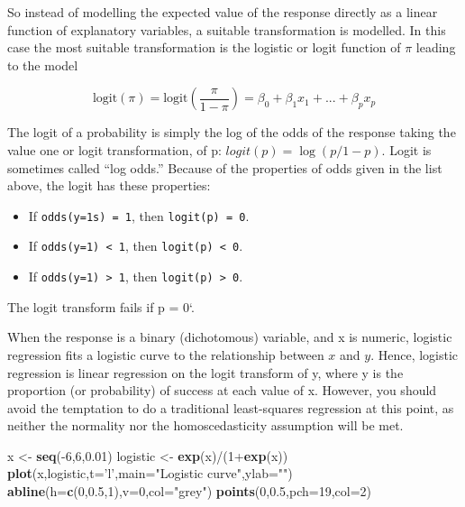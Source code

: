\documentclass[]{article}
\def\tightlist{}
\newenvironment{Shaded}{\begin{snugshade}}{\end{snugshade}}
\newcommand{\KeywordTok}[1]{\textcolor[rgb]{0.13,0.29,0.53}{\textbf{{#1}}}}
\newcommand{\DataTypeTok}[1]{\textcolor[rgb]{0.13,0.29,0.53}{{#1}}}
\newcommand{\DecValTok}[1]{\textcolor[rgb]{0.00,0.00,0.81}{{#1}}}
\newcommand{\FloatTok}[1]{\textcolor[rgb]{0.00,0.00,0.81}{{#1}}}
\newcommand{\StringTok}[1]{\textcolor[rgb]{0.31,0.60,0.02}{{#1}}}
\newcommand{\NormalTok}[1]{{#1}}
\numberwithin{equation}{section}
\begin{document}
So instead of modelling the expected value of the response directly as a
linear function of explanatory variables, a suitable transformation is
modelled. In this case the most suitable transformation is the logistic
or logit function of \(\pi\) leading to the model

\[
  \mbox{logit}(\pi) = \mbox{logit}\left(\frac{\pi}{1-\pi}\right) = \beta_0 + \beta_1x_1 + ... + \beta_p x_p
\]

The logit of a probability is simply the log of the odds of the response
taking the value one or logit transformation, of p:
\(logit(p) = \log(p/1-p)\). Logit is sometimes called ``log odds.''
Because of the properties of odds given in the list above, the logit has
these properties:

\begin{itemize}
\tightlist
\item
  If \texttt{odds(y=1s)\ =\ 1}, then \texttt{logit(p)\ =\ 0}.
\item
  If \texttt{odds(y=1)\ \textless{}\ 1}, then
  \texttt{logit(p)\ \textless{}\ 0}.
\item
  If \texttt{odds(y=1)\ \textgreater{}\ 1}, then
  \texttt{logit(p)\ \textgreater{}\ 0}.
\end{itemize}

The logit transform fails if p = 0`.

When the response is a binary (dichotomous) variable, and x is numeric,
logistic regression fits a logistic curve to the relationship between
\(x\) and \(y\). Hence, logistic regression is linear regression on the
logit transform of y, where y is the proportion (or probability) of
success at each value of x. However, you should avoid the temptation to
do a traditional least-squares regression at this point, as neither the
normality nor the homoscedasticity assumption will be met.

\begin{Shaded}
\begin{Highlighting}[]
\NormalTok{x <-}\StringTok{ }\KeywordTok{seq}\NormalTok{(-}\DecValTok{6}\NormalTok{,}\DecValTok{6}\NormalTok{,}\FloatTok{0.01}\NormalTok{)}
\NormalTok{logistic <-}\StringTok{ }\KeywordTok{exp}\NormalTok{(x)/(}\DecValTok{1}\NormalTok{+}\KeywordTok{exp}\NormalTok{(x))}
\KeywordTok{plot}\NormalTok{(x,logistic,}\DataTypeTok{t=}\StringTok{'l'}\NormalTok{,}\DataTypeTok{main=}\StringTok{"Logistic curve"}\NormalTok{,}\DataTypeTok{ylab=}\StringTok{""}\NormalTok{)}
\KeywordTok{abline}\NormalTok{(}\DataTypeTok{h=}\KeywordTok{c}\NormalTok{(}\DecValTok{0}\NormalTok{,}\FloatTok{0.5}\NormalTok{,}\DecValTok{1}\NormalTok{),}\DataTypeTok{v=}\DecValTok{0}\NormalTok{,}\DataTypeTok{col=}\StringTok{"grey"}\NormalTok{)}
\KeywordTok{points}\NormalTok{(}\DecValTok{0}\NormalTok{,}\FloatTok{0.5}\NormalTok{,}\DataTypeTok{pch=}\DecValTok{19}\NormalTok{,}\DataTypeTok{col=}\DecValTok{2}\NormalTok{)}
\end{Highlighting}
\end{Shaded}
\end{document}
